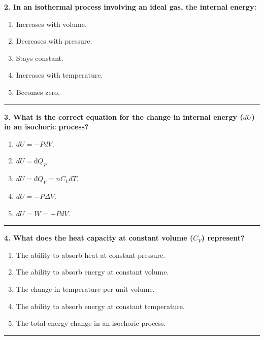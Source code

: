 \documentclass[
  9pt,
]{extbook}
\providecommand{\tightlist}{%
  \setlength{\itemsep}{0pt}\setlength{\parskip}{0pt}}
\theoremstyle{definition}
\theoremstyle{definition}
\theoremstyle{definition}
\theoremstyle{definition}
\theoremstyle{remark}
\begin{document}
\textbf{2. In an isothermal process involving an ideal gas, the internal energy:}

\begin{enumerate}
\def\labelenumi{\alph{enumi}.}
\tightlist
\item
  Increases with volume.
\item
  Decreases with pressure.
\item
  Stays constant.
\item
  Increases with temperature.
\item
  Becomes zero.
\end{enumerate}

\begin{center}\rule{0.5\linewidth}{0.5pt}\end{center}

\textbf{3. What is the correct equation for the change in internal energy (\(dU\)) in an isochoric process?}

\begin{enumerate}
\def\labelenumi{\alph{enumi}.}
\tightlist
\item
  \(dU = -P dV\).
\item
  \(dU = đQ_P\).
\item
  \(dU = đQ_V = nC_V dT\).
\item
  \(dU = -P \Delta V\).
\item
  \(dU = W = -P dV\).
\end{enumerate}

\begin{center}\rule{0.5\linewidth}{0.5pt}\end{center}

\textbf{4. What does the heat capacity at constant volume (\(C_V\)) represent?}

\begin{enumerate}
\def\labelenumi{\alph{enumi}.}
\tightlist
\item
  The ability to absorb heat at constant pressure.
\item
  The ability to absorb energy at constant volume.
\item
  The change in temperature per unit volume.
\item
  The ability to absorb energy at constant temperature.
\item
  The total energy change in an isochoric process.
\end{enumerate}

\begin{center}\rule{0.5\linewidth}{0.5pt}\end{center}
\end{document}
